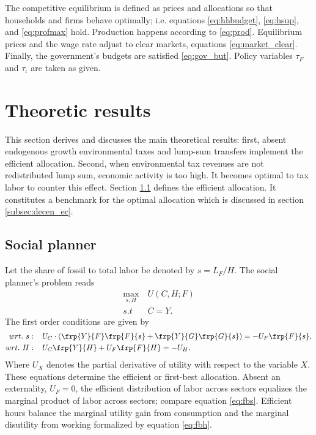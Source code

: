 The competitive equilibrium is defined as prices and allocations so that households and firms behave optimally; i.e. equations \ref{eq:hhbudget}, \ref{eq:hsup}, and \ref{eq:profmax} hold. Production happens according to \ref{eq:prod}.  Equilibrium prices and the wage rate adjust to clear markets, equations \ref{eq:market_clear}. Finally, the government's budgets are satisfied \ref{eq:gov_but}. Policy variables $\tau_F$ and $\tau_\iota$ are taken as given. 

\section{Theoretic results}\label{sec:theory}
This section derives and discusses the main theoretical results: first, absent endogenous growth environmental taxes and lump-sum transfers implement the efficient allocation. Second, when environmental tax revenues are not redistributed lump sum, economic activity is too high. It becomes optimal to tax labor to counter this effect. Section \ref{subsec:sp} defines the efficient allocation. It constitutes a benchmark for the optimal allocation which is discussed in section \ref{subsec:decen_ec}. 
\subsection{Social planner}\label{subsec:sp}
Let the share of fossil to total labor be denoted by $s=L_F/H$. The social planner's problem reads
\begin{align}
\underset{s, H}{\max}\ & U(C,H; F)\\ s.t\ \ & C=Y.
\end{align}
The first order conditions are given by
\begin{align}
wrt.\ s:\hspace{4mm} & U_C \cdot \left(\frp{Y}{F}\frp{F}{s}+\frp{Y}{G}\frp{G}{s}\right)=-U_F\frp{F}{s}, \label{eq:fbs}
\\
wrt.\ H:\hspace{4mm} & U_C\frp{Y}{H}+U_F\frp{F}{H}=-U_H\label{eq:fbh}. 
\end{align}
Where $U_X$ denotes the partial derivative of utility with respect to the variable $X$.
These equations determine the efficient or first-best allocation. 
Absent an externality, $U_F=0$, the efficient distribution of labor across sectors equalizes the marginal product of labor across sectors; compare equation \ref{eq:fbs}. Efficient hours balance the marginal utility gain from consumption and the marginal disutility from working formalized by equation \ref{eq:fbh}. 

